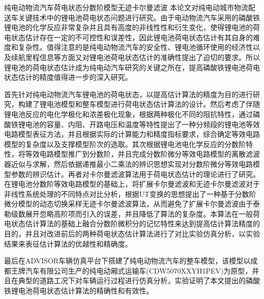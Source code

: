 
\begin{Cabstract}{纯电动物流汽车}{荷电状态}{分数阶模型}{无迹卡尔曼滤波}{}
本论文对纯电动城市物流配送车关键技术中的锂电池荷电状态问题进行研究。由于电动物流汽车采用的磷酸铁锂电池的化学反应非常复杂并且具有高度的非线性性和衍生变化，使得锂电池的荷电状态估计存在一定的不可控性和误差性，因此锂电池荷电状态估计有其自身的难度和复杂性。值得注意的是纯电动物流汽车的安全性、锂电池循环使用的经济性以及续航里程信息等方面又对锂电池荷电状态估计的准确性提出了迫切的要求。所以锂电池的荷电状态估计成为纯电动汽车研究的关键之所在，提高磷酸铁锂电池荷电状态估计的精度值得进一步的深入研究。

首先针对纯电动物流汽车锂电池的荷电状态，以提高估计算法的精度为目的进行研究，构建了锂电池模型和整车模型进行荷电状态估计算法的设计。然后考虑了伴随锂电池反应的电化学极化和浓差极化现象，根据两种极化不同的阻抗特性，通过磷酸铁锂电池的容量、内阻、开路电压和温度等特性提出了一种分频段的锂电池等效电路模型表征方法，并且根据实际的计算能力和精度指标要求，综合确定等效电路模型的复杂度以及支撑模型阶次的选取。其次根据锂电池电化学反应的分数阶特性，将等效电路模型推广到分数阶，并且完成分数阶微分等效电路模型的离散滤波器近似与求解，然后依据递推最小二乘法的辨识思想实现对分数阶微分等效电路模型参数的辨识估计。再者对卡尔曼滤波算法用于荷电状态估计的理论进行了研究。在锂电池分数阶等效电路模型的基础上，将扩展卡尔曼滤波和无迹卡尔曼滤波对于非线性系统处理的不同特点对比分析，根据UT变换的思想提出了一种基于分数阶微分模型的动态切换采样无迹卡尔曼滤波算法，从而避免了扩展卡尔曼滤波由于泰勒级数展开忽略高阶项而引入的误差，并且降低了算法的复杂度。本算法在一般荷电状态估计算法的基础上融合分数阶微积分的记忆特性来达到提高估计算法精度的目的，并且对改进前后的两种荷电状态估计算法进行了对比实验仿真分析，以实验结果来表征估计算法的优越性和精确度。

	最后在ADVISOR车辆仿真平台下搭建了纯电动物流汽车的整车模型，该模型以成都王牌汽车有限公司生产的纯电动厢式运输车(CDW5070XXYH1PEV)为原型，并且在典型的道路工况下对车辆运行过程进行仿真分析，实验证明了本文提出的磷酸铁锂电池荷电状态估计算法的精确性和有效性。
\end{Cabstract}
